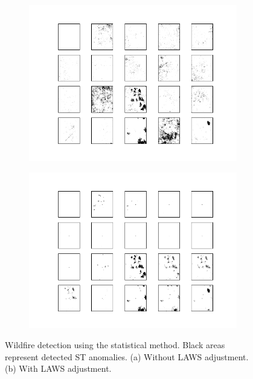 \documentclass[11pt]{article}
\begin{document}
\begin{figure}[H]
     \centering
     
      \begin{subfigure}[b]{0.45\textwidth}
		\centering
		\includegraphics[width=\textwidth]{../figure/statistical_method_no_laws}
		\caption{}
	 \end{subfigure}
         \hfill
      \begin{subfigure}[b]{0.45\textwidth}
         \includegraphics[width=\textwidth]{../figure/statistical_method_laws}
         \caption{}
     \end{subfigure}
         \caption{Wildfire detection using the statistical method. Black areas represent detected ST anomalies. (a) Without LAWS adjustment. (b) With LAWS adjustment.}
      \label{fig: statistical_method_real_data}
\end{figure}
\end{document}
